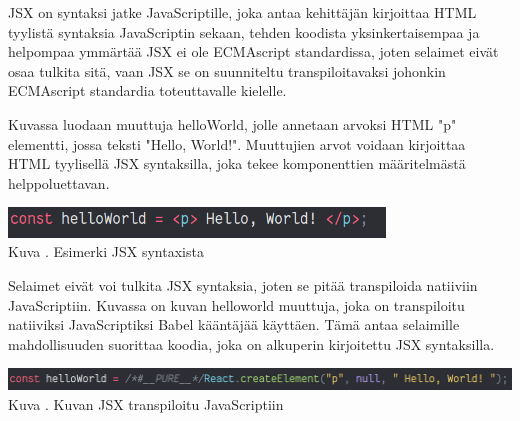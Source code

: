 






JSX on syntaksi jatke JavaScriptille, joka antaa kehittäjän kirjoittaa HTML tyylistä syntaksia JavaScriptin sekaan,
tehden koodista yksinkertaisempaa ja helpompaa ymmärtää
JSX ei ole ECMAscript standardissa, joten selaimet eivät osaa tulkita sitä,
vaan JSX se on suunniteltu transpiloitavaksi johonkin ECMAscript standardia toteuttavalle kielelle.
\medskip






Kuvassa \nextImageCount{} luodaan muuttuja helloWorld, jolle annetaan arvoksi HTML "p"{} elementti, jossa teksti "Hello, World!"{}.
Muuttujien arvot voidaan kirjoittaa HTML tyylisellä JSX syntaksilla, 
joka tekee komponenttien määritelmästä helppoluettavan.
\medskip



\bigskip
\includegraphics[width=10cm]{src/public/oppar/pure_jsx_example.png}\\
Kuva \getImgCount {}. Esimerki JSX syntaxista
\medskip




Selaimet eivät voi tulkita JSX syntaksia, joten se pitää transpiloida natiiviin JavaScriptiin.
Kuvassa \nextImageCount{} on kuvan \theimgCounter{} helloworld muuttuja, joka on transpiloitu natiiviksi JavaScriptiksi Babel kääntäjää käyttäen.
Tämä antaa selaimille mahdollisuuden suorittaa koodia, joka on alkuperin kirjoitettu JSX syntaksilla.
\medskip


\bigskip
\includegraphics[width=15cm]{src/public/oppar/transpiled_jsx_example.png}\\
Kuva \getImgCount {}. Kuvan \prevImageCount{} JSX transpiloitu JavaScriptiin
\medskip





